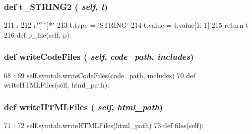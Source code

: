 \begin{DoxyVerb}
{\subsubsection[{t\_\-STRING2}]{\setlength{\rightskip}{0pt plus 5cm}def t\_\-STRING2 ( {\em self}, \/   {\em t})}}
\label{classslicc_1_1parser_1_1SLICC_a94aee35d70b10376860b1df963c6408f}



\begin{DoxyCode}
211                           :
212         r"\'[^'\n]*\'"
213         t.type = 'STRING'
214         t.value = t.value[1:-1]
215         return t
216 
    def p_file(self, p):
\end{DoxyCode}
\hypertarget{classslicc_1_1parser_1_1SLICC_a69d0582bde832d4ff45237ab5ff116bb}{
\subsubsection[{writeCodeFiles}]{\setlength{\rightskip}{0pt plus 5cm}def writeCodeFiles ( {\em self}, \/   {\em code\_\-path}, \/   {\em includes})}}
\label{classslicc_1_1parser_1_1SLICC_a69d0582bde832d4ff45237ab5ff116bb}



\begin{DoxyCode}
68                                                  :
69         self.symtab.writeCodeFiles(code_path, includes)
70 
    def writeHTMLFiles(self, html_path):
\end{DoxyCode}
\hypertarget{classslicc_1_1parser_1_1SLICC_abc09a7197df5d7ef04e5cdfaa1139ead}{
\subsubsection[{writeHTMLFiles}]{\setlength{\rightskip}{0pt plus 5cm}def writeHTMLFiles ( {\em self}, \/   {\em html\_\-path})}}
\label{classslicc_1_1parser_1_1SLICC_abc09a7197df5d7ef04e5cdfaa1139ead}



\begin{DoxyCode}
71                                        :
72         self.symtab.writeHTMLFiles(html_path)
73 
    def files(self):
\end{DoxyCode}



\end{DoxyVerb}
